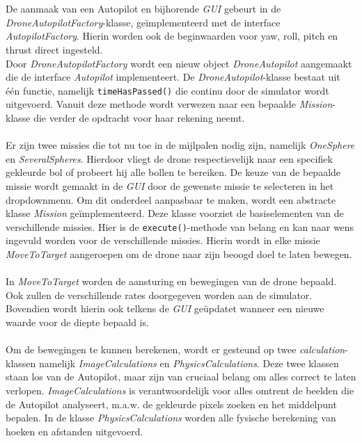 \\
\\
De aanmaak van een Autopilot en bijhorende \textit{GUI} gebeurt in de \textit{DroneAutopilotFactory}-klasse, ge\"implementeerd met de interface \textit{AutopilotFactory}. Hierin worden ook de beginwaarden voor yaw, roll, pitch en thrust direct ingesteld. 
\\
Door \textit{DroneAutopilotFactory} wordt een nieuw object \textit{DroneAutopilot} aangemaakt die de interface \textit{Autopilot} implementeert. De \textit{DroneAutopilot}-klasse bestaat uit één functie, namelijk \texttt{timeHasPassed()} die continu door de simulator wordt uitgevoerd. Vanuit deze methode wordt verwezen naar een bepaalde \textit{Mission}-klasse die verder de opdracht voor haar rekening neemt.
\\
\\
Er zijn twee missies die tot nu toe in de mijlpalen nodig zijn, namelijk \textit{OneSphere} en \textit{SeveralSpheres}. Hierdoor vliegt de drone respectievelijk naar een specifiek gekleurde bol of probeert hij alle bollen te bereiken. De keuze van de bepaalde missie wordt gemaakt in de \textit{GUI} door de gewenste missie te selecteren in het dropdownmenu. Om dit onderdeel aanpasbaar te maken, wordt een abstracte klasse \textit{Mission} ge\"implementeerd. Deze klasse voorziet de basiselementen van de verschillende missies. Hier is de \texttt{execute()}-methode van belang en kan naar wens ingevuld worden voor de verschillende missies. Hierin wordt in elke missie \textit{MoveToTarget} aangeroepen om de drone naar zijn beoogd doel te laten bewegen.
\\
\\
In \textit{MoveToTarget} worden de aansturing en bewegingen van de drone bepaald. Ook zullen de verschillende rates doorgegeven worden aan de simulator. Bovendien wordt hierin ook telkens de \textit{GUI} ge\"updatet wanneer een nieuwe waarde voor de diepte bepaald is.
\\
\\
Om de bewegingen te kunnen berekenen, wordt er gesteund op twee \textit{calculation}-klassen namelijk \textit{ImageCalculations} en \textit{PhysicsCalculations}. Deze twee klassen staan los van de Autopilot, maar zijn van cruciaal belang om alles correct te laten verlopen. \textit{ImageCalculations} is verantwoordelijk voor alles omtrent de beelden die de Autopilot analyseert, m.a.w. de gekleurde pixels zoeken en het middelpunt bepalen.
In de klasse \textit{PhysicsCalculations} worden alle fysische berekening van hoeken en afstanden uitgevoerd.
